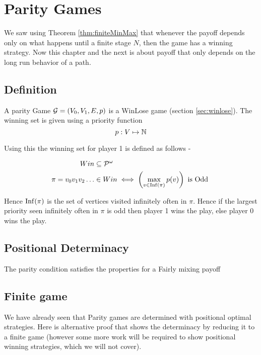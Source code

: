 \chapter{Parity Games}

We saw using Theorem \ref{thm:finiteMinMax} that whenever the payoff depends only on what happens until a finite stage $N$, then the game has a winning strategy. Now this chapter and the next is about payoff that only depends on the long run behavior of a path.

\section{Definition}
A parity Game $\mathcal{G}=(V_0,V_1,E,p)$ is a WinLose game (section \ref{sec:winlose}). The winning set is given using a priority function 
\begin{equation}
    p : V \mapsto \mathbb{N} \label{eq:priority}
\end{equation}

Using this the winning set for player 1 is defined as follows -

\begin{align}
    Win &\subseteq \mathcal{P}^\omega \nonumber \\
    \pi = v_0v_1v_2 \ldots &\in Win \iff \left(\max_{v \in \operatorname*{Inf}(\pi)} p(v)\right) \text{ is Odd } \label{cond:parity}
\end{align}

Hence $\operatorname*{Inf}(\pi)$ is the set of vertices visited infinitely often in $\pi$.
Hence if the largest priority seen infinitely often in $\pi$ is odd then player 1 wins the play, else player 0 wins the play.

\section{Positional Determinacy}
The parity condition satisfies the properties for a Fairly mixing payoff

\section{Finite game}
We have already seen that Parity games are determined with positional optimal strategies. Here is alternative proof that shows the determinacy by reducing it to a finite game (however some more work will be required to show positional winning strategies, which we will not cover).

